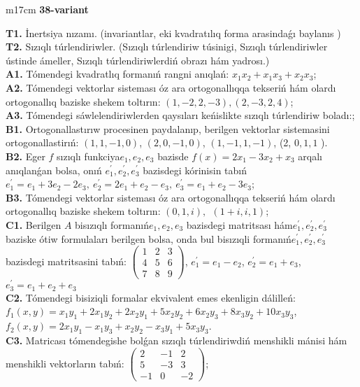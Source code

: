 \documentclass{article}
\begin{document}
\begin{tabular}{m{17cm}}
\textbf{38-variant}
\newline

\textbf{T1.} İnertsiya nızamı. (invariantlar,  eki kvadratılıq forma arasindaǵı baylanıs ) \\
\textbf{T2.} Sızıqlı túrlendiriwler.  (Sızıqlı túrlendiriw túsinigi, Sızıqlı túrlendiriwler ústinde ámeller, Sızıqlı túrlendiriwlerdiń obrazı hám yadrosı.) \\
\textbf{A1.} Tómendegi kvadratlıq formanıń rangni anıqlań: \(x_{1}x_{2} + x_{1}x_{3} + x_{2}x_{3}\); \\
\textbf{A2.} Tómendegi vektorlar sisteması óz ara ortogonallıqqa tekseriń hám olardı ortogonallıq baziske shekem toltırın: \((1, - 2,2, - 3),(2, - 3,2,4)\); \\
\textbf{A3.} Tómendegi sáwlelendiriwlerden qaysıları keńislikte sızıqlı túrlendiriw boladı:; \\
\textbf{B1.} Ortogonallastırıw procesinen paydalanıp, berilgen vektorlar sistemasini ortogonallastirıń: \((1,1, - 1,0)\), \((2,0, - 1,0)\), \((1, - 1,1, - 1)\), (2, \(0,1,1\) ). \\
\textbf{B2.} Eger \(f\) sızıqlı funkciya\(e_{1},e_{2},e_{3}\) bazisde \(f(x) = 2x_{1} - 3x_{2} + x_{3}\) arqalı anıqlanǵan bolsa, onıń \(e_{1}^{'},e_{2}^{'},e_{3}^{'}\) bazisdegi kórinisin tabıń\(e_{1}^{'} = e_{1} + 3e_{2} - 2e_{3},\ e_{2}^{'} = 2e_{1} + e_{2} - e_{3},\ e_{3}^{'} = e_{1} + e_{2} - 3e_{3}\); \\
\textbf{B3.} Tómendegi vektorlar sisteması óz ara ortogonallıqqa tekseriń hám olardı ortogonallıq baziske shekem toltırın: \((0,1,i),\ \ (1 + i,i,1)\); \\
\textbf{C1.} Berilgen \(A\) bisızıqlı formanıń\(e_{1},e_{2},e_{3}\) bazisdegi matritsası hám\(e_{1}^{'},e_{2}^{'},e_{3}^{'}\) baziske ótiw formulaları berilgen bolsa, onda bul bisızıqli formanıń\(e_{1}^{'},e_{2}^{'},e_{3}^{'}\) bazisdegi matritsasini tabıń: \(\begin{pmatrix} 1 & 2 & 3 \\ 4 & 5 & 6 \\ 7 & 8 & 9 \end{pmatrix}\), \(e_{1}^{'} = e_{1} - e_{2}\), \(e_{2}^{'} = e_{1} + e_{3}\), \(e_{3}^{'} = e_{1} + e_{2} + e_{3}\) \\
\textbf{C2.} Tómendegi bisiziqli formalar ekvivalent emes ekenligin dálilleń:\(f_{1}(x,y) = x_{1}y_{1} + 2x_{1}y_{2} + 2x_{2}y_{1} + 5x_{2}y_{2} + 6x_{2}y_{3} + 8x_{3}y_{2} + 10x_{3}y_{3}\), \(f_{2}(x,y) = 2x_{1}y_{1} - x_{1}y_{3} + x_{2}y_{2} - x_{3}y_{1} + 5x_{3}y_{3}\). \\
\textbf{C3.} Matricası tómendegishe bolǵan sızıqlı túrlendiriwdiń menshikli mánisi hám menshikli vektorların tabıń: \(\begin{pmatrix} 2 & - 1 & 2 \\ 5 & - 3 & 3 \\  - 1 & 0 & - 2 \end{pmatrix}\); \\

\end{tabular}
\vspace{1cm}
\end{document}
